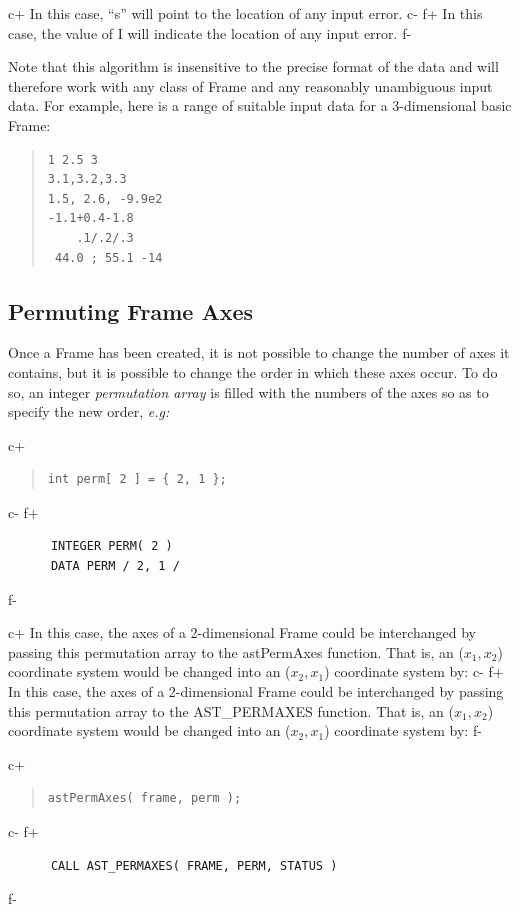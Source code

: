 \documentclass[twoside,11pt]{article}
\begin{document}
c+
In this case, ``s'' will point to the location of any input error.
c-
f+
In this case, the value of I will indicate the location of any input error.
f-

Note that this algorithm is insensitive to the precise format of the
data and will therefore work with any class of Frame and any
reasonably unambiguous input data. For example, here is a range of
suitable input data for a 3-dimensional basic Frame:

\begin{quote}
\small
\begin{verbatim}
1 2.5 3
3.1,3.2,3.3
1.5, 2.6, -9.9e2
-1.1+0.4-1.8
    .1/.2/.3
 44.0 ; 55.1 -14
\end{verbatim}
\normalsize
\end{quote}

\subsection{\label{ss:permutingaxes}Permuting Frame Axes}

Once a Frame has been created, it is not possible to change the number
of axes it contains, but it is possible to change the order in which
these axes occur. To do so, an integer {\em{permutation array}} is
filled with the numbers of the axes so as to specify the new order,
{\em{e.g:}}

c+
\begin{quote}
\small
\begin{verbatim}
int perm[ 2 ] = { 2, 1 };
\end{verbatim}
\normalsize
\end{quote}
c-
f+
\small
\begin{verbatim}
      INTEGER PERM( 2 )
      DATA PERM / 2, 1 /
\end{verbatim}
\normalsize
f-

c+
In this case, the axes of a 2-dimensional Frame could be interchanged
by passing this permutation array to the astPermAxes function. That
is, an ($x_1,x_2$) coordinate system would be changed into an
($x_2,x_1$) coordinate system by:
c-
f+
In this case, the axes of a 2-dimensional Frame could be interchanged
by passing this permutation array to the AST\_PERMAXES function. That
is, an ($x_1,x_2$) coordinate system would be changed into an
($x_2,x_1$) coordinate system by:
f-

c+
\begin{quote}
\small
\begin{verbatim}
astPermAxes( frame, perm );
\end{verbatim}
\normalsize
\end{quote}
c-
f+
\small
\begin{verbatim}
      CALL AST_PERMAXES( FRAME, PERM, STATUS )
\end{verbatim}
\normalsize
f-
\end{document}

